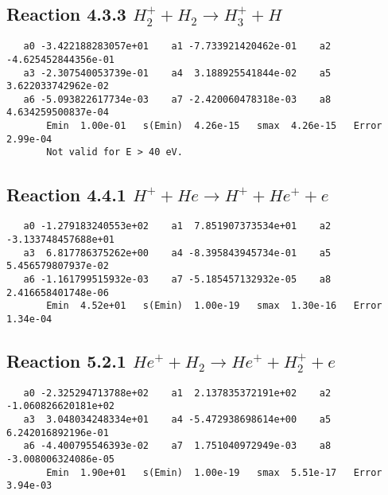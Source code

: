 \documentclass[12pt]{article}
\begin{document}
                              


\newpage
\subsection{
Reaction 4.3.3 $   H_2^+ + H_2 \rightarrow H_3^+ + H$}


\begin{small}\begin{verbatim}
   a0 -3.422188283057e+01    a1 -7.733921420462e-01    a2 -4.625452844356e-01
   a3 -2.307540053739e-01    a4  3.188925541844e-02    a5  3.622033742962e-02
   a6 -5.093822617734e-03    a7 -2.420060478318e-03    a8  4.634259500837e-04
       Emin  1.00e-01   s(Emin)  4.26e-15   smax  4.26e-15   Error  2.99e-04
       Not valid for E > 40 eV.
\end{verbatim}\end{small}

\newpage
\subsection{
Reaction 4.4.1 $   H^+ + He \rightarrow H^+ + He^+ + e$}


\begin{small}\begin{verbatim}
   a0 -1.279183240553e+02    a1  7.851907373534e+01    a2 -3.133748457688e+01
   a3  6.817786375262e+00    a4 -8.395843945734e-01    a5  5.456579807937e-02
   a6 -1.161799515932e-03    a7 -5.185457132932e-05    a8  2.416658401748e-06
       Emin  4.52e+01   s(Emin)  1.00e-19   smax  1.30e-16   Error  1.34e-04
\end{verbatim}\end{small}

\newpage
\subsection{
Reaction 5.2.1 $   He^+ + H_2 \rightarrow He^+ + H_2^+ + e$}


\begin{small}\begin{verbatim}
   a0 -2.325294713788e+02    a1  2.137835372191e+02    a2 -1.060826620181e+02
   a3  3.048034248334e+01    a4 -5.472938698614e+00    a5  6.242016892196e-01
   a6 -4.400795546393e-02    a7  1.751040972949e-03    a8 -3.008006324086e-05
       Emin  1.90e+01   s(Emin)  1.00e-19   smax  5.51e-17   Error  3.94e-03
\end{verbatim}\end{small}
\end{document}
